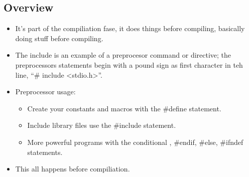 \subsection{Overview}
\begin{itemize}
    \item It's part of the compiliation fase, it does things before compiling, basically doing stuff before compiling.
    \item The include is an example of a preprocesor command or directive; the preprocessors statements begin with a pound sign as first character in teh line, ``\# include <stdio.h>''.
    \item Preprocessor usage:
        \begin{itemize}
            \item Create your constants and macros with the \#define statement.
            \item Include library files use the \#include statement.
            \item More powerful programs with the conditional \ifdef, \#endif, \#else, \#ifndef statements.
        \end{itemize}
    
    \item This all happens before compiliation.
\end{itemize}
